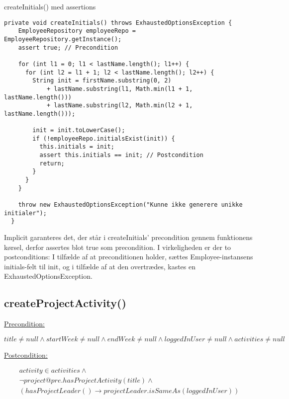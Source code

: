 \begin{listing}[H]
    \centering
    \caption{createInitials() med assertions}\label{lst:create_initials_assertions}
    \begin{verbatim}
private void createInitials() throws ExhaustedOptionsException {
    EmployeeRepository employeeRepo = EmployeeRepository.getInstance();
    assert true; // Precondition

    for (int l1 = 0; l1 < lastName.length(); l1++) {
      for (int l2 = l1 + 1; l2 < lastName.length(); l2++) {
        String init = firstName.substring(0, 2)
            + lastName.substring(l1, Math.min(l1 + 1, lastName.length()))
            + lastName.substring(l2, Math.min(l2 + 1, lastName.length()));

        init = init.toLowerCase();
        if (!employeeRepo.initialsExist(init)) {
          this.initials = init;
          assert this.initials == init; // Postcondition
          return;
        }
      }
    }

    throw new ExhaustedOptionsException("Kunne ikke generere unikke initialer");
  }
    \end{verbatim}
\end{listing}
\noindent
Implicit garanteres det, der står i createInitials' precondition gennem funktionens kørsel, derfor assertes blot true som precondition. I virkeligheden er der to postconditions: I tilfælde af at preconditionen holder, sættes Employee-instansens initials-felt til init, og i tilfælde af at den overtrædes, kastes en ExhaustedOptionsException.\\[4mm]

\subsection{createProjectActivity()} \label{sec:contract_create_project_activity}
\underline{Precondition:}
\vspace{4pt}

\begin{equation}
    title \neq null \wedge startWeek \neq null \wedge endWeek \neq null \wedge loggedInUser \neq null \wedge activities \neq null
\end{equation}
\vspace{4pt}

\noindent
\underline{Postcondition:}
\vspace{4pt}

\begin{equation}
\begin{gathered}
    activity \in activities \wedge \\
    \neg project@pre.hasProjectActivity(title) \wedge \\
    (hasProjectLeader() \to projectLeader.isSameAs(loggedInUser))
\end{gathered}
\end{equation}


